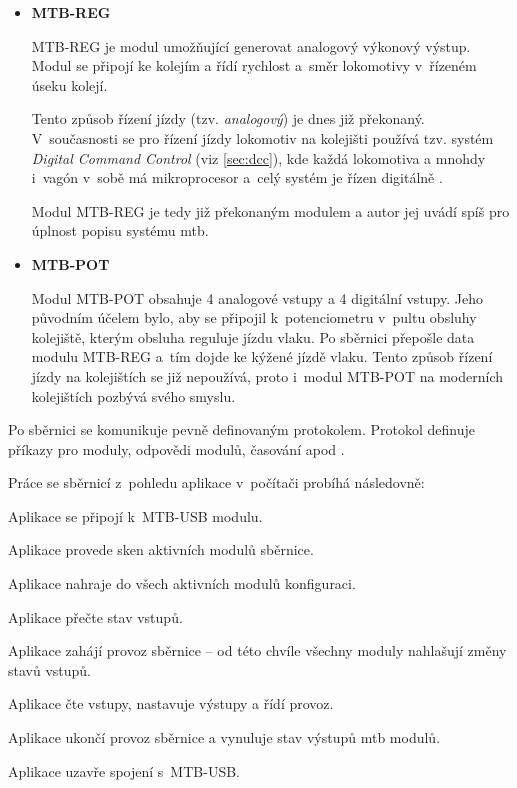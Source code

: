 \begin{itemize}
\item \textbf{MTB-REG}

	MTB-REG je modul umožňující generovat analogový výkonový výstup. Modul se
	připojí ke kolejím a řídí rychlost a~směr lokomotivy v~řízeném úseku kolejí.

	Tento způsob řízení jízdy (tzv. \textit{analogový}) je dnes již překonaný.
	V~současnosti se pro řízení jízdy lokomotiv na kolejišti používá tzv. systém
	\textit{Digital Command Control} (viz \ref{sec:dcc}), kde každá lokomotiva
	a mnohdy i~vagón v~sobě má mikroprocesor a~celý systém je řízen
	digitálně \cite{dcc_intro:web}.

	Modul MTB-REG je tedy již překonaným modulem a autor jej uvádí spíš pro
	úplnost popisu systému \gls{mtb}.

\item \textbf{MTB-POT}

	Modul MTB-POT obsahuje 4 analogové vstupy a 4 digitální vstupy. Jeho
	původním účelem bylo, aby se připojil k~potenciometru v~pultu obsluhy
	kolejiště, kterým obsluha reguluje jízdu vlaku. Po sběrnici přepošle data
	modulu MTB-REG a~tím dojde ke kýžené jízdě vlaku. Tento způsob řízení jízdy
	na kolejištích se již nepoužívá, proto i~modul MTB-POT na moderních
	kolejištích pozbývá svého smyslu.

\end{itemize}

Po sběrnici se komunikuje pevně definovaným protokolem.  Protokol definuje
příkazy pro moduly, odpovědi modulů, časování apod \cite{mtbbus-specs}.

Práce se sběrnicí z~pohledu aplikace v~počítači probíhá následovně:

\begin{compactenum}
\item Aplikace se připojí k~MTB-USB modulu.
\item Aplikace provede sken aktivních modulů sběrnice.
\item Aplikace nahraje do všech aktivních modulů konfiguraci.
\item Aplikace přečte stav vstupů.
\item Aplikace zahájí provoz sběrnice – od této chvíle všechny moduly nahlašují
	změny stavů vstupů.
\item Aplikace čte vstupy, nastavuje výstupy a řídí provoz.
\item Aplikace ukončí provoz sběrnice a vynuluje stav výstupů \gls{mtb} modulů.
\item Aplikace uzavře spojení s~MTB-USB.
\end{compactenum}



